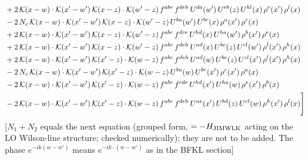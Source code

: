 \documentclass[9pt]{article}
\numberwithin{equation}{section}
\begin{document}
\begin{align}
&+2\,\mathcal{K}(x-w)\cdot\mathcal{K}(x'-w')\,\mathcal{K}(x-z)\cdot\mathcal{K}(w'-z)\,f^{abc}\,f^{deh}\,U^{da}(w')\,U^{eb}(z)\,U^{hl}(x)\,\rho^{c}(x')\,\rho^{l}(x)\notag\\
&-2\,N_{c}\,\mathcal{K}(x-w)\cdot\mathcal{K}(x'-w')\,\mathcal{K}(x-z)\cdot\mathcal{K}(w'-z)\,U^{ba}(w')\,U^{bc}(x)\,\rho^{a}(x')\,\rho^{c}(x)\notag\\
&+2\,\mathcal{K}(x-w)\cdot\mathcal{K}(x'-w')\,\mathcal{K}(x-z)\cdot\mathcal{K}(w'-z)\,f^{abc}\,f^{dce}\,U^{hd}(x)\,U^{ha}(w')\,\rho^{b}(x')\,\rho^{e}(x)\notag\\
&+2\,\mathcal{K}(x-w)\cdot\mathcal{K}(x'-w')\,\mathcal{K}(x-z)\cdot\mathcal{K}(w'-z)\,f^{abc}\,f^{deh}\,U^{ad}(x)\,U^{be}(z)\,U^{cl}(w')\,\rho^{l}(x')\,\rho^{h}(x)\notag\\
&+2\,\mathcal{K}(x-w)\cdot\mathcal{K}(x'-w')\,\mathcal{K}(x'-z)\cdot\mathcal{K}(w-z)\,f^{abc}\,f^{deh}\,U^{ad}(w)\,U^{be}(z)\,U^{cl}(x')\,\rho^{l}(x')\,\rho^{h}(x)\notag\\
&-2\,N_{c}\,\mathcal{K}(x-w)\cdot\mathcal{K}(x'-w')\,\mathcal{K}(x'-z)\cdot\mathcal{K}(w-z)\,U^{ba}(w)\,U^{bc}(x')\,\rho^{c}(x')\,\rho^{a}(x)\notag\\
&-2\,\mathcal{K}(x-w)\cdot\mathcal{K}(x'-w')\,\mathcal{K}(x'-z)\cdot\mathcal{K}(w-z)\,f^{abc}\,f^{cde}\,U^{hd}(x')\,U^{ha}(w)\,\rho^{e}(x')\,\rho^{b}(x)\notag\\
&-2\,\mathcal{K}(x-w)\cdot\mathcal{K}(x'-w')\,\mathcal{K}(x'-z)\cdot\mathcal{K}(w-z)\,f^{abc}\,f^{deh}\,U^{ae}(x')\,U^{bd}(z)\,U^{cl}(w)\,\rho^{h}(x')\,\rho^{l}(x)\Bigg]
\end{align} {\color{red}[$N_{1}+N_{2}$ equals the next equation (grouped form, $=-H_{\rm JIMWLK}$ acting on the LO Wilson-line structure; checked numerically); they are not to be added. The phase $e^{-ik(w-w')}$ means $e^{-ik\cdot(w-w')}$ as in the BFKL section]}\par\noindent
\end{document}
